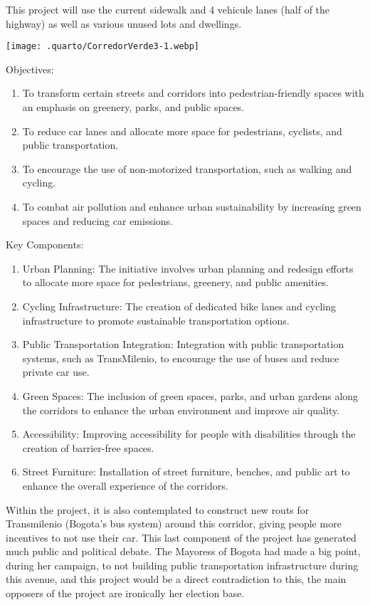 \documentclass[
  letterpaper,
  DIV=11,
  numbers=noendperiod]{scrreprt}
\begin{document}
This project will use the current sidewalk and 4 vehicule lanes (half of
the highway) as well as various unused lots and dwellings.

\texttt{[image: .quarto/CorredorVerde3-1.webp]}

Objectives:

\begin{enumerate}
\def\labelenumi{\arabic{enumi}.}
\item
  To transform certain streets and corridors into pedestrian-friendly
  spaces with an emphasis on greenery, parks, and public spaces.
\item
  To reduce car lanes and allocate more space for pedestrians, cyclists,
  and public transportation.
\item
  To encourage the use of non-motorized transportation, such as walking
  and cycling.
\item
  To combat air pollution and enhance urban sustainability by increasing
  green spaces and reducing car emissions.
\end{enumerate}

Key Components:

\begin{enumerate}
\def\labelenumi{\arabic{enumi}.}
\item
  Urban Planning: The initiative involves urban planning and redesign
  efforts to allocate more space for pedestrians, greenery, and public
  amenities.
\item
  Cycling Infrastructure: The creation of dedicated bike lanes and
  cycling infrastructure to promote sustainable transportation options.
\item
  Public Transportation Integration: Integration with public
  transportation systems, such as TransMilenio, to encourage the use of
  buses and reduce private car use.
\item
  Green Spaces: The inclusion of green spaces, parks, and urban gardens
  along the corridors to enhance the urban environment and improve air
  quality.
\item
  Accessibility: Improving accessibility for people with disabilities
  through the creation of barrier-free spaces.
\item
  Street Furniture: Installation of street furniture, benches, and
  public art to enhance the overall experience of the corridors.
\end{enumerate}

Within the project, it is also contemplated to construct new routs for
Transmilenio (Bogota's bus system) around this corridor, giving people
more incentives to not use their car. This last component of the project
has generated much public and political debate. The Mayoress of Bogota
had made a big point, during her campaign, to not building public
transportation infrastructure during this avenue, and this project would
be a direct contradiction to this, the main opposers of the project are
ironically her election base.
\end{document}
